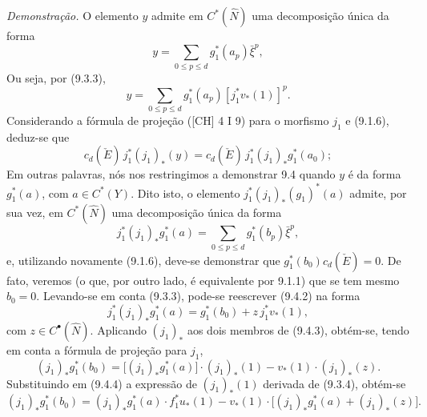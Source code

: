 \emph{Demonstração.} O elemento $y$ admite em $C^*(\widehat N)$ uma decomposição única da forma
\[
y=\sum_{0\le p\le d}g_1^*(a_p)\bar\xi^p,
\]
Ou seja, por (9.3.3),
\[
y=\sum_{0\le p\le d}g_1^*(a_p)[j_1^*v_*(1)]^p.
\tag{9.4.1}
\]
Considerando a fórmula de projeção ([CH] 4 I 9) para o morfismo $j_1$ e (9.1.6), deduz-se que
\[
c_d(\check E)\,j_1^*(j_1)_*(y)=c_d(\check E)\,j_1^*(j_1)_*g_1^*(a_0);
\]
Em outras palavras, nós nos restringimos a demonstrar 9.4 quando $y$ é da forma $g_1^*(a)$, com $a\in C^*(Y)$. Dito isto, o elemento $j_1^*(j_1)_*(g_1)^*(a)$ admite, por sua vez, em $C^*(\widehat N)$ uma decomposição única da forma
\[
j_1^*(j_1)_*g_1^*(a)=\sum_{0\le p\le d}g_1^*(b_p)\bar\xi^p,
\tag{9.4.2}
\]
e, utilizando novamente (9.1.6), deve-se demonstrar que $g_1^*(b_0)c_d(\check E)=0$. De fato, veremos (o que, por outro lado, é equivalente por 9.1.1) que se tem mesmo $b_0=0$. Levando-se em conta (9.3.3), pode-se reescrever (9.4.2) na forma
\[
j_1^*(j_1)_*g_1^*(a)=g_1^*(b_0)+z\,j_1^*v_*(1),
\tag{9.4.3}
\]
com $z\in C^{\bullet}(\widehat N)$. Aplicando $(j_1)_*$ aos dois membros de (9.4.3), obtém-se, tendo em conta a fórmula de projeção para $j_1$,
\[
(j_1)_*g_1^*(b_0)=\bigl[(j_1)_*g_1^*(a)\bigr]\cdot(j_1)_*(1)-v_*(1)\cdot(j_1)_*(z).
\tag{9.4.4}
\]
Substituindo em (9.4.4) a expressão de $(j_1)_*(1)$ derivada de (9.3.4), obtém-se
\[
(j_1)_*g_1^*(b_0)=
(j_1)_*g_1^*(a)\cdot f_1^*u_*(1)-v_*(1)\cdot\bigl[(j_1)_*g_1^*(a)+(j_1)_*(z)\bigr].
\tag{9.4.5}
\]
